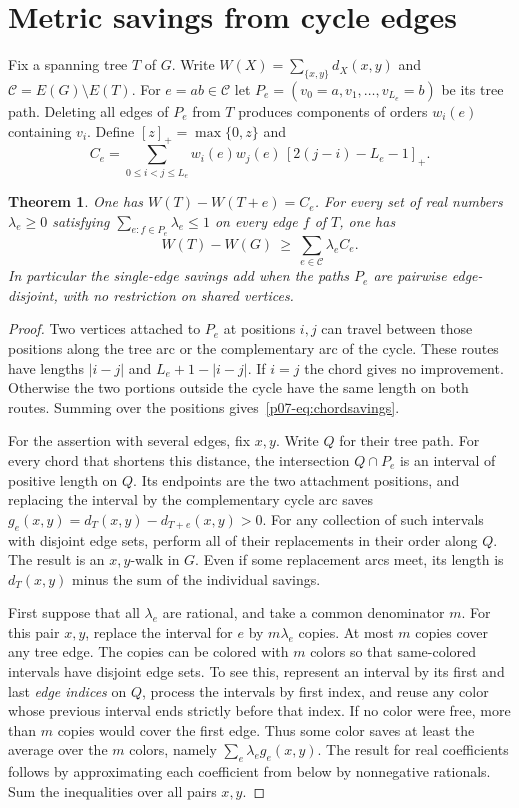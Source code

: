 \documentclass[11pt,a4paper]{article}
\newtheorem{theorem}{Theorem}[section]
\begin{document}
\section{Metric savings from cycle edges}
Fix a spanning tree $T$ of $G$. Write $W(X)=\sum_{\{x,y\}}d_X(x,y)$ and
$\mathcal C=E(G)\setminus E(T)$. For $e=ab\in\mathcal C$ let
$P_e=(v_0=a,v_1,\ldots,v_{L_e}=b)$ be its tree path. Deleting all
edges of $P_e$ from $T$ produces components of orders $w_i(e)$ containing
$v_i$. Define $[z]_+=\max\{0,z\}$ and
\begin{equation}\label{p07-eq:chordsavings}
 C_e=\sum_{0\le i<j\le L_e}w_i(e)w_j(e)\,[2(j-i)-L_e-1]_+ .
\end{equation}
\begin{theorem}\label{p07-thm:chordpack}
One has $W(T)-W(T+e)=C_e$. For every set of real numbers
$\lambda_e\ge0$ satisfying $\sum_{e:f\in P_e}\lambda_e\le1$ on every
edge $f$ of $T$, one has
\[
 W(T)-W(G)\ \ge\ \sum_{e\in\mathcal C}\lambda_e C_e .
\]
In particular the single-edge savings add when the paths $P_e$ are
pairwise edge-disjoint, with no restriction on shared vertices.
\end{theorem}
\begin{proof}
Two vertices attached to $P_e$ at positions $i,j$ can travel between
those positions along the tree arc or the complementary arc of the cycle.
These routes have lengths $|i-j|$ and $L_e+1-|i-j|$. If $i=j$ the
chord gives no improvement. Otherwise the two portions outside the
cycle have the same length on both routes. Summing over the positions
gives~\eqref{p07-eq:chordsavings}.

For the assertion with several edges, fix $x,y$. Write $Q$ for their
tree path. For every chord that shortens this distance, the intersection
$Q\cap P_e$ is an interval of positive length on $Q$. Its endpoints
are the two attachment positions, and replacing the interval by the
complementary cycle arc saves $g_e(x,y)=d_T(x,y)-d_{T+e}(x,y)>0$.
For any collection of such intervals with disjoint edge sets, perform
all of their replacements in their order along $Q$. The result is an
$x,y$-walk in $G$. Even if some replacement arcs meet, its length is
$d_T(x,y)$ minus the sum of the individual savings.

First suppose that all $\lambda_e$ are rational, and take a common
denominator $m$. For this pair $x,y$, replace the interval for $e$ by
$m\lambda_e$ copies. At most $m$ copies cover any tree edge. The copies
can be colored with $m$ colors so that same-colored intervals have
disjoint edge sets. To see this, represent an interval by its first and
last \emph{edge indices} on $Q$, process the intervals by first index,
and reuse any color whose previous interval ends strictly before that
index. If no color were free, more than $m$ copies would cover the first
edge. Thus some color saves at least the average over the $m$ colors,
namely $\sum_e\lambda_e g_e(x,y)$. The result for real coefficients
follows by approximating each coefficient from below by nonnegative
rationals. Sum the inequalities over all pairs $x,y$.
\end{proof}
\end{document}
